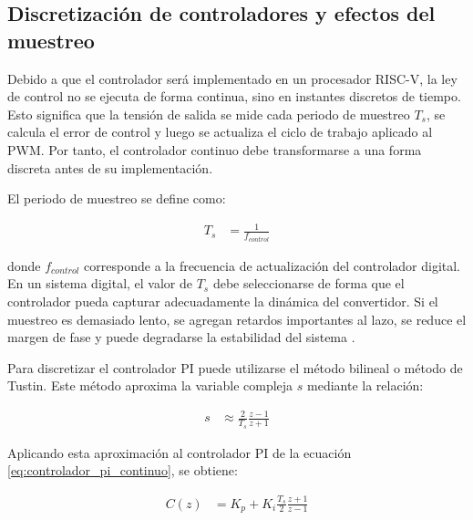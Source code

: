 \documentclass[conference]{IEEEtran}
\begin{document}
\subsection{Discretización de controladores y efectos del muestreo}

Debido a que el controlador será implementado en un procesador RISC-V, la ley de control no se ejecuta de forma continua, sino en instantes discretos de tiempo. Esto significa que la tensión de salida se mide cada periodo de muestreo $T_s$, se calcula el error de control y luego se actualiza el ciclo de trabajo aplicado al PWM. Por tanto, el controlador continuo debe transformarse a una forma discreta antes de su implementación.

El periodo de muestreo se define como:

\begin{equation}
\begin{aligned}
    T_s &= \frac{1}{f_{control}}
\end{aligned}
\label{eq:periodo_muestreo}
\end{equation}

donde $f_{control}$ corresponde a la frecuencia de actualización del controlador digital. En un sistema digital, el valor de $T_s$ debe seleccionarse de forma que el controlador pueda capturar adecuadamente la dinámica del convertidor. Si el muestreo es demasiado lento, se agregan retardos importantes al lazo, se reduce el margen de fase y puede degradarse la estabilidad del sistema \cite{franklin1998digital}.

Para discretizar el controlador PI puede utilizarse el método bilineal o método de Tustin. Este método aproxima la variable compleja $s$ mediante la relación:

\begin{equation}
\begin{aligned}
    s &\approx \frac{2}{T_s}\frac{z-1}{z+1}
\end{aligned}
\label{eq:tustin}
\end{equation}

Aplicando esta aproximación al controlador PI de la ecuación \ref{eq:controlador_pi_continuo}, se obtiene:

\begin{equation}
\begin{aligned}
    C(z) &= K_p + K_i\frac{T_s}{2}\frac{z+1}{z-1}
\end{aligned}
\label{eq:pi_discreto_tustin}
\end{equation}
\end{document}
